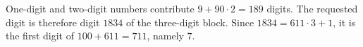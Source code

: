 One-digit and two-digit numbers contribute $9+90\cdot2=189$ digits. The requested digit is therefore digit $1834$ of the three-digit block. Since $1834=611\cdot3+1$, it is the first digit of $100+611=711$, namely $\boxed7$.
